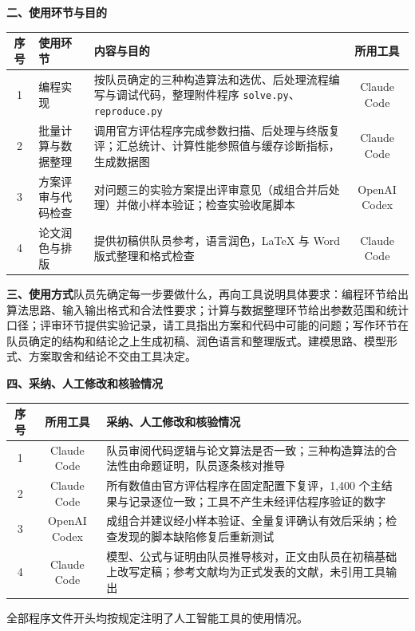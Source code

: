\noindent\textbf{二、使用环节与目的}
\begin{center}\small
\begin{tabular}{c p{2.6cm} p{9.2cm} c}
\toprule
序号 & 使用环节 & 内容与目的 & 所用工具 \\
\midrule
1 & 编程实现 & 按队员确定的三种构造算法和选优、后处理流程编写与调试代码，整理附件程序 \texttt{solve.py}、\texttt{reproduce.py} & Claude Code \\
2 & 批量计算与数据整理 & 调用官方评估程序完成参数扫描、后处理与终版复评；汇总统计、计算性能参照值与缓存诊断指标，生成数据图 & Claude Code \\
3 & 方案评审与代码检查 & 对问题三的实验方案提出评审意见（成组合并后处理）并做小样本验证；检查实验收尾脚本 & OpenAI Codex \\
4 & 论文润色与排版 & 提供初稿供队员参考，语言润色，LaTeX 与 Word 版式整理和格式检查 & Claude Code \\
\bottomrule
\end{tabular}
\end{center}

\noindent\textbf{三、使用方式}\quad 队员先确定每一步要做什么，再向工具说明具体要求：编程环节给出算法思路、输入输出格式和合法性要求；计算与数据整理环节给出参数范围和统计口径；评审环节提供实验记录，请工具指出方案和代码中可能的问题；写作环节在队员确定的结构和结论之上生成初稿、润色语言和整理版式。建模思路、模型形式、方案取舍和结论不交由工具决定。

\noindent\textbf{四、采纳、人工修改和核验情况}
\begin{center}\small
\begin{tabular}{c c p{11.6cm}}
\toprule
序号 & 所用工具 & 采纳、人工修改和核验情况 \\
\midrule
1 & Claude Code & 队员审阅代码逻辑与论文算法是否一致；三种构造算法的合法性由命题证明，队员逐条核对推导 \\
2 & Claude Code & 所有数值由官方评估程序在固定配置下复评，1{,}400 个主结果与记录逐位一致；工具不产生未经评估程序验证的数字 \\
3 & OpenAI Codex & 成组合并建议经小样本验证、全量复评确认有效后采纳；检查发现的脚本缺陷修复后重新测试 \\
4 & Claude Code & 模型、公式与证明由队员推导核对，正文由队员在初稿基础上改写定稿；参考文献均为正式发表的文献，未引用工具输出 \\
\bottomrule
\end{tabular}
\end{center}

全部程序文件开头均按规定注明了人工智能工具的使用情况。
